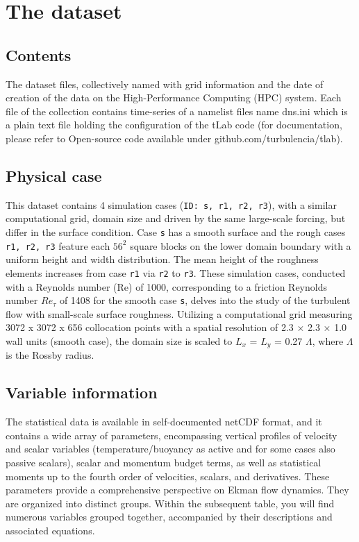 \documentclass[11pt]{article}
\begin{document}
\section{The dataset}

\subsection{Contents}

The dataset files, collectively named with grid information and the date of creation of the data on the High-Performance Computing (HPC) system. Each file of the collection contains time-series of a namelist files name dns.ini which is a plain text file holding the configuration of the tLab code (for documentation, please refer to Open-source code available under github.com/turbulencia/tlab). \\

\subsection{Physical case}

This dataset contains 4 simulation cases (\texttt{ID: s, r1, r2, r3}), with a similar computational grid, domain size and driven by the same large-scale forcing, but differ in the surface condition. Case \texttt{s} has a smooth surface and the rough cases \texttt{r1, r2, r3} feature each $56^2$ square blocks on the lower domain boundary with a uniform height and width distribution. The mean height of the roughness elements increases from case \texttt{r1} via \texttt{r2} to \texttt{r3}.
These simulation cases, conducted with a Reynolds number (Re) of 1000, corresponding to a friction Reynolds number \(Re_{\tau}\) of 1408 for the smooth case \texttt{s}, delves into the study of the turbulent flow with small-scale surface roughness. Utilizing a computational grid measuring 3072 x 3072 x 656 collocation points with a spatial resolution of 2.3 × 2.3 × 1.0 wall units (smooth case), the domain size is scaled to \(L_x\) = \(L_y\) = 0.27 \(\Lambda\), where \(\Lambda\) is the Rossby radius.\\

\subsection{Variable information}

The statistical data is available in self-documented netCDF format, and it contains a wide array of parameters, encompassing vertical profiles of velocity and scalar variables (temperature/buoyancy as active and for some cases also passive scalars), scalar and momentum budget terms, as well as statistical moments up to the fourth order of velocities, scalars, and derivatives. These parameters provide a comprehensive perspective on Ekman flow dynamics. They are organized into distinct groups. Within the subsequent table, you will find numerous variables grouped together, accompanied by their descriptions and associated equations.
\end{document}
